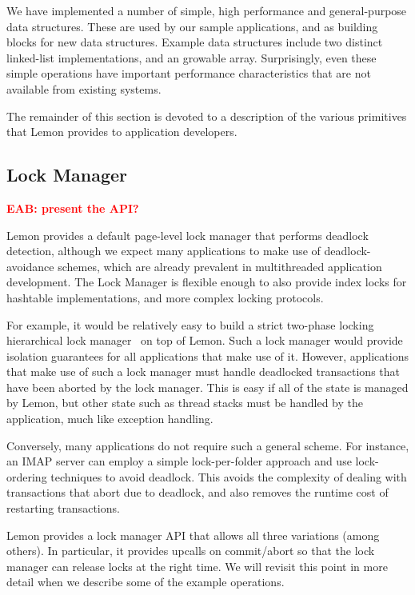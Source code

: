 \documentclass[letterpaper,twocolumn,english]{article}
\newcommand{\yad}{Lemon\xspace}
\newcommand{\eab}[1]{\textcolor{red}{\bf EAB: #1}}
\begin{document}
We have implemented a number of simple, high performance
and general-purpose data structures.  These are used by our sample
applications, and as building blocks for new data structures.  Example
data structures include two distinct linked-list implementations, and
an growable array.  Surprisingly, even these simple operations have
important performance characteristics that are not available from
existing systems.

The remainder of this section is devoted to a description of the
various primitives that \yad provides to application developers.

\subsection{Lock Manager}
\label{lock-manager}
\eab{present the API?}

 \yad
provides a default page-level lock manager that performs deadlock
detection, although we expect many applications to make use of
deadlock-avoidance schemes, which are already prevalent in
multithreaded application development.  The Lock Manager is flexible
enough to also provide index locks for hashtable implementations, and more complex locking protocols.

For example, it would be relatively easy to build a strict two-phase
locking hierarchical lock
manager~\cite{hierarcicalLocking,hierarchicalLockingOnAriesExample} on
top of \yad.  Such a lock manager would provide isolation guarantees
for all applications that make use of it.  However, applications that
make use of such a lock manager must handle deadlocked transactions
that have been aborted by the lock manager.  This is easy if all of
the state is managed by \yad, but other state such as thread stacks
must be handled by the application, much like exception handling.

Conversely, many applications do not require such a general scheme.
For instance, an IMAP server can employ a simple lock-per-folder
approach and use lock-ordering techniques to avoid deadlock.  This
avoids the complexity of dealing with transactions that abort due
to deadlock, and also removes the runtime cost of restarting 
transactions.

\yad provides a lock manager API that allows all three variations
(among others). In particular, it provides upcalls on commit/abort so
that the lock manager can release locks at the right time. We will
revisit this point in more detail when we describe some of the example
operations.
\end{document}
